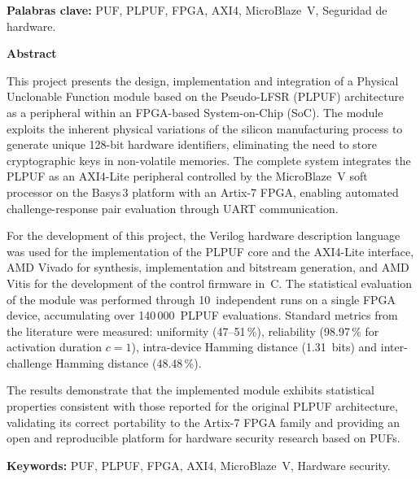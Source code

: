 \noindent\textbf{Palabras clave:} PUF, PLPUF, FPGA, AXI4,
MicroBlaze~V, Seguridad de hardware.

\cleardoublepage

\begin{center}
  \vspace*{1.5cm}
  {\Huge\bfseries Abstract}
\end{center}

\vspace{1.5cm}

This project presents the design, implementation and integration of a
Physical Unclonable Function module based on the Pseudo-LFSR (PLPUF)
architecture as a peripheral within an FPGA-based System-on-Chip (SoC). The
module exploits the inherent physical variations of the silicon manufacturing
process to generate unique 128-bit hardware identifiers, eliminating the need
to store cryptographic keys in non-volatile memories. The complete system
integrates the PLPUF as an AXI4-Lite peripheral controlled by the
MicroBlaze~V soft processor on the Basys\,3 platform with an Artix-7 FPGA,
enabling automated challenge-response pair evaluation through UART
communication.

For the development of this project, the Verilog hardware description
language was used for the implementation of the PLPUF core and the AXI4-Lite
interface, AMD Vivado for synthesis, implementation and bitstream
generation, and AMD Vitis for the development of the control firmware in~C.
The statistical evaluation of the module was performed through
10~independent runs on a single FPGA device, accumulating over
140\,000~PLPUF evaluations. Standard metrics from the literature were
measured: uniformity (47--51\,\%), reliability (98.97\,\% for activation
duration $c = 1$), intra-device Hamming distance (1.31~bits) and
inter-challenge Hamming distance (48.48\,\%).

The
results demonstrate that the implemented module exhibits statistical
properties consistent with those reported for the original PLPUF
architecture, validating its correct portability to the Artix-7 FPGA family
and providing an open and reproducible platform for hardware security
research based on PUFs.

\vspace{1cm}

\noindent\textbf{Keywords:} PUF, PLPUF, FPGA, AXI4,
MicroBlaze~V, Hardware security.

\cleardoublepage

